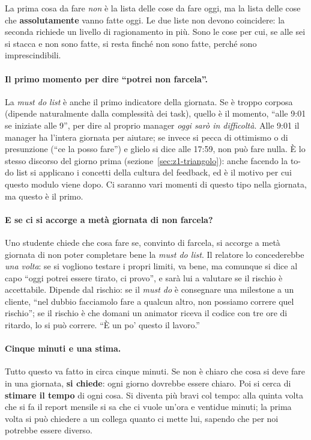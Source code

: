 La prima cosa da fare \emph{non} è la lista delle cose da fare oggi, ma la lista
delle cose che \textbf{assolutamente} vanno fatte oggi. Le due liste non devono
coincidere: la seconda richiede un livello di ragionamento in più. Sono le cose
per cui, se alle sei si stacca e non sono fatte, si resta finché non sono fatte,
perché sono imprescindibili.

\paragraph{Il primo momento per dire ``potrei non farcela''.} La \emph{must do
list} è anche il primo indicatore della giornata. Se è troppo corposa (dipende
naturalmente dalla complessità dei task), quello è il momento, ``alle 9:01 se
iniziate alle 9'', per dire al proprio manager \emph{oggi sarò in difficoltà}.
Alle 9:01 il manager ha l'intera giornata per aiutare; se invece si pecca di
ottimismo o di presunzione (``ce la posso fare'') e glielo si dice alle 17:59,
non può fare nulla. È lo stesso discorso del giorno prima
(sezione~\ref{sec:z1-triangolo}): anche facendo la to-do list si applicano i
concetti della cultura del feedback, ed è il motivo per cui questo modulo viene
dopo. Ci saranno vari momenti di questo tipo nella giornata, ma questo è il
primo.

\paragraph{E se ci si accorge a metà giornata di non farcela?} Uno studente
chiede che cosa fare se, convinto di farcela, si accorge a metà giornata di non
poter completare bene la \emph{must do list}. Il relatore lo concederebbe
\emph{una volta}: se si vogliono testare i propri limiti, va bene, ma
comunque si dice al capo ``oggi potrei essere tirato, ci provo'', e sarà lui a
valutare se il rischio è accettabile. Dipende dal rischio: se il \emph{must do}
è consegnare una milestone a un cliente, ``nel dubbio facciamolo fare a
qualcun altro, non possiamo correre quel rischio''; se il rischio è che domani
un animator riceva il codice con tre ore di ritardo, lo si può correre. ``È un
po' questo il lavoro.''

\paragraph{Cinque minuti e una stima.} Tutto questo va fatto in circa cinque
minuti. Se non è chiaro che cosa si deve fare in una giornata, \textbf{si
chiede}: ogni giorno dovrebbe essere chiaro. Poi si cerca di \textbf{stimare il
tempo} di ogni cosa. Si diventa più bravi col tempo: alla quinta volta che si
fa il report mensile si sa che ci vuole un'ora e ventidue minuti; la prima volta
si può chiedere a un collega quanto ci mette lui, sapendo che per noi potrebbe
essere diverso.

